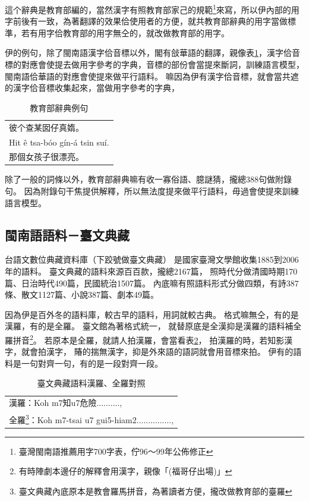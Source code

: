 這个辭典是教育部編的，當然漢字有照教育部家己的規範\footnote{臺灣閩南語推薦用字700字表，佇96～99年公佈修正}來寫，所以伊內部的用字前後有一致，為著翻譯的效果佮使用者的方便，就共教育部辭典的用字當做標準，若有用字佮教育部的用字無仝的，就改做教育部的用字。%

伊的例句，除了閩南語漢字佮音標以外，閣有敆華語的翻譯，親像表\ref{表：教育部辭典例句}，漢字佮音標的對應會使提去做用字參考的字典，音標的部份會當提來斷詞，訓練語言模型，閩南語佮華語的對應會使提來做平行語料。
嘛因為伊有漢字佮音標，就會當共遮的漢字佮音標收集起來，當做用字參考的字典，
\begin{table}
\caption{教育部辭典例句}
\label{表：教育部辭典例句}
\centering
\begin{tabular}{l}
彼个查某囡仔真媠。 \\
Hit ê tsa-bóo gín-á tsin suí.\\
那個女孩子很漂亮。\\
\end{tabular}
\end{table}

除了一般的詞條以外，教育部辭典嘛有收一寡俗語、臆謎猜，攏總388句做附錄句。
因為附錄句干焦提供解釋，所以無法度提來做平行語料，毋過會使提來訓練語言模型。


\subsection{閩南語語料－臺文典藏}
\label{節：臺文典藏}
台語文數位典藏資料庫（下跤號做臺文典藏）\cite{台語文數位典藏資料庫}
是國家臺灣文學館收集1885到2006年的語料。
臺文典藏的語料來源百百款，攏總2167篇，
照時代分做清國時期170篇、日治時代490篇，民國統治1507篇。
內底嘛有照語料形式分做四類，有詩387條、散文1127篇、小說387篇、劇本49篇。%

因為伊是百外冬的語料庫，較古早的語料，用詞就較古典。
格式嘛無仝，有的是漢羅，有的是全羅。
臺文館為著格式統一，
就替原底是全漢抑是漢羅的語料補全羅拼音\footnote{有時陣劇本邊仔的解釋會用漢字，親像「(福哥仔出場)」}。
若原本是全羅，就請人拍漢羅，會當看表\ref{表：臺文典藏語料}，
拍漢羅的時，若知影漢字，就會拍漢字，
賰的揣無漢字，抑是外來語的語詞就會用音標來拍。
伊有的語料是一句對齊一句，有的是一段對齊一段。

\begin{table}
\caption{臺文典藏語料漢羅、全羅對照}
\label{表：臺文典藏語料}
\centering
\begin{tabular}{l}
漢羅：Koh m7知u7危險.........., \\
全羅\footnote{臺文典藏內底原本是教會羅馬拼音，為著讀者方便，攏改做教育部的臺羅}：Koh m7-tsai u7 gui5-hiam2...............,\\
\end{tabular}
\end{table}


